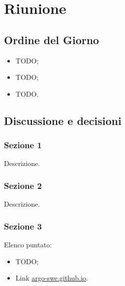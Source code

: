 \section{Riunione}
\subsection{Ordine del Giorno}
\begin{itemize}
	\item TODO;
	\item TODO;
	\item TODO.
\end{itemize}

\subsection{Discussione e decisioni}

\subsubsection{Sezione 1}
Descrizione.

\subsubsection{Sezione 2}
Descrizione.

\subsubsection{Sezione 3}
Elenco puntato:
\begin{itemize}
	\item TODO;
	\item Link \href{https://argo-swe.github.io}{argo-swe.github.io}.
\end{itemize}
\clearpage
